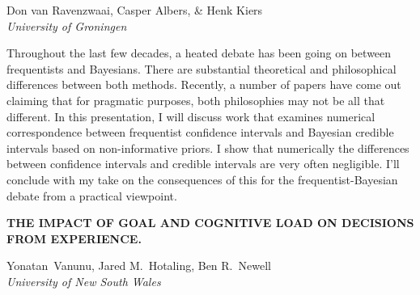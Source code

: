 \documentclass[]{article}
\begin{document}
Don van Ravenzwaai, Casper Albers, \& Henk Kiers\\
\emph{University of Groningen }

Throughout the last few decades, a heated debate has been going on
between frequentists and Bayesians. There are substantial theoretical
and philosophical differences between both methods. Recently, a number
of papers have come out claiming that for pragmatic purposes, both
philosophies may not be all that different. In this presentation, I will
discuss work that examines numerical correspondence between frequentist
confidence intervals and Bayesian credible intervals based on
non-informative priors. I show that numerically the differences between
confidence intervals and credible intervals are very often negligible.
I'll conclude with my take on the consequences of this for the
frequentist-Bayesian debate from a practical viewpoint.\\
\pagebreak  

\textbf{THE IMPACT OF GOAL AND COGNITIVE LOAD ON DECISIONS FROM
EXPERIENCE.}

Yonatan~Vanunu, Jared M.~Hotaling, Ben R.~Newell\\
\emph{University of New South Wales}
\end{document}
